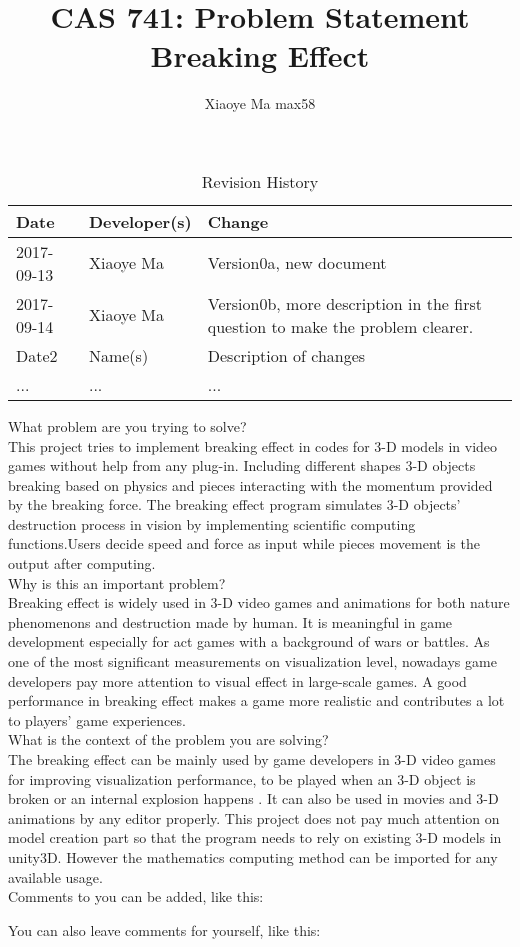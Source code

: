 \documentclass{article}
\title{CAS 741: Problem Statement\\Breaking Effect}
\author{Xiaoye Ma max58}
\date{}
\begin{document}
\maketitle

\begin{table}[hp]
\caption{Revision History} \label{TblRevisionHistory}
\begin{tabularx}{\textwidth}{llX}
\toprule
\textbf{Date} & \textbf{Developer(s)} & \textbf{Change}\\
\midrule
2017-09-13 & Xiaoye Ma & Version0a, new document\\
2017-09-14 & Xiaoye Ma & Version0b, more description in the first question to make the problem clearer.\\
Date2 & Name(s) & Description of changes\\
... & ... & ...\\
\bottomrule
\end{tabularx}
\end{table}

What problem are you trying to solve?\\

This project tries to implement breaking effect in codes for 3-D models in video games without help from any plug-in. Including different shapes 3-D objects breaking based on physics and pieces interacting with the momentum provided by the breaking force. The breaking effect program simulates 3-D objects’ destruction process in vision by implementing scientific computing functions.Users decide speed and force as input while pieces movement is the output after computing.\\      

Why is this an important problem?\\

Breaking effect is widely used in 3-D video games and animations for both nature phenomenons and destruction made by human. It is meaningful in game development especially for act games with a background of wars or battles. As one of the most significant measurements on visualization level, nowadays game developers pay more attention to visual effect in large-scale games. A good performance in breaking effect makes a game more realistic and contributes a lot to players’ game experiences.\\ 

What is the context of the problem you are solving?\\

The breaking effect can be mainly used by game developers in 3-D video games for improving visualization performance, to be played when an 3-D object is broken or an internal explosion happens . It can also be used in movies and 3-D animations by any editor properly. This project does not pay much attention on model creation part so that the program needs to rely on existing 3-D models in unity3D. However the mathematics computing method can be imported for any available usage. \\

Comments to you can be added, like this:


You can also leave comments for yourself, like this:

\end{document}
